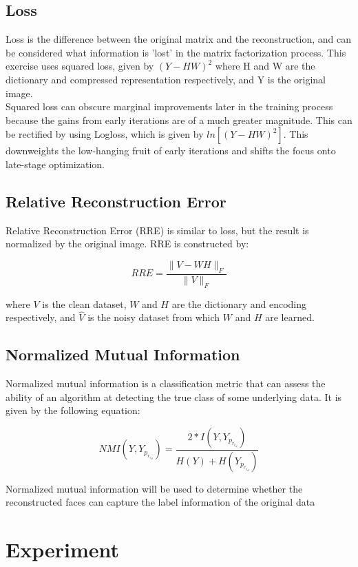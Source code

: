 \documentclass{article} %
\begin{document}
\subsection{Loss}
Loss is the difference between the original matrix and the reconstruction, and can be considered what information is 'lost' in the matrix factorization process. This exercise uses squared loss, given by \((Y - HW)^2\) where H and W are the dictionary and compressed representation respectively, and Y is the original image.\\

Squared loss can obscure marginal improvements later in the training process because the gains from early iterations are of a much greater magnitude. This can be rectified by using Logloss, which is given by \(ln[ (Y - HW)^2 ]\). This downweights the low-hanging fruit of early iterations and shifts the focus onto late-stage optimization.\\

\subsection{Relative Reconstruction Error}
Relative Reconstruction Error (RRE) is similar to loss, but the result is normalized by the original image. RRE is constructed by:

\[RRE = \frac{\|V - WH\|_F}{\|V\|_F}\]

where $V$ is the clean dataset, $W$ and $H$ are the dictionary and encoding respectively, and $\hat{V}$ is the noisy dataset from which $W$ and $H$ are learned.\\

\subsection{Normalized Mutual Information}

Normalized mutual information is a classification metric that can assess the ability of an algorithm at detecting the true class of some underlying data. It is given by the following equation:

\[ NMI(Y,Y_p_r_e_d) =  \frac{2 * I(Y,Y_p_r_e_d)}{H(Y) + H(Y_p_r_e_d)}\]

Normalized mutual information will be used to determine whether the reconstructed faces can capture the label information of the original data


\section{Experiment}
\end{document}
